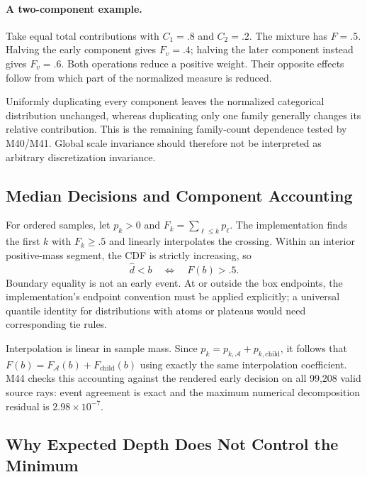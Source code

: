 \paragraph{A two-component example.}
Take equal total contributions with $C_1=.8$ and $C_2=.2$.
The mixture has $F=.5$. Halving the early component gives $F_v=.4$; halving the later component
instead gives $F_v=.6$. Both operations reduce a positive weight.
Their opposite effects follow from which part of the normalized measure is reduced.

Uniformly duplicating every component leaves the normalized categorical distribution unchanged,
whereas duplicating only one family generally changes its relative contribution.
This is the remaining family-count dependence tested by M40/M41.
Global scale invariance should therefore not be interpreted as arbitrary discretization invariance.

\subsection{Median Decisions and Component Accounting}

For ordered samples, let $p_k>0$ and $F_k=\sum_{\ell\leq k}p_\ell$.
The implementation finds the first $k$ with $F_k\geq .5$ and linearly interpolates the crossing.
Within an interior positive-mass segment, the CDF is strictly increasing, so
\begin{equation}
\widehat d<b\quad\Longleftrightarrow\quad F(b)>.5.
\label{eq:archive-categorical-boundary}
\end{equation}
Boundary equality is not an early event.
At or outside the box endpoints, the implementation's endpoint convention must be applied explicitly;
a universal quantile identity for distributions with atoms or plateaus would need corresponding tie rules.

Interpolation is linear in sample mass.
Since $p_k=p_{k,\mathcal A}+p_{k,\mathrm{child}}$, it follows that
$F(b)=F_{\mathcal A}(b)+F_{\mathrm{child}}(b)$ using exactly the same interpolation coefficient.
M44 checks this accounting against the rendered early decision on all 99,208 valid source rays:
event agreement is exact and the maximum numerical decomposition residual is $2.98\times10^{-7}$.

\subsection{Why Expected Depth Does Not Control the Minimum}

